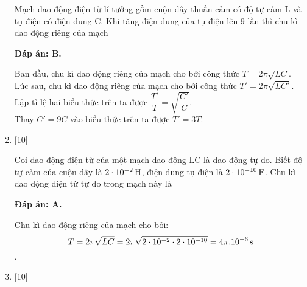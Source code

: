 \begin{enumerate}[label=\bfseries Câu \arabic*:]
	\cauhoi
	{Mạch dao động điện từ lí tưởng gồm cuộn dây thuần cảm có độ tự cảm L và tụ điện có điện dung C. Khi tăng điện dung của tụ điện lên 9 lần thì chu kì dao động riêng của mạch
	}
	
	\loigiai
	{		\textbf{Đáp án: B.}
		
		Ban đầu, chu kì dao động riêng của mạch cho bởi công thức $T = 2\pi \sqrt{LC}$. \\
		Lúc sau, chu kì dao động riêng của mạch cho bởi công thức $T' = 2\pi \sqrt{LC'}$. \\
		Lập tỉ lệ hai biểu thức trên ta được $\dfrac{T'}{T} = \sqrt{\dfrac{C'}{C}}$. \\
		Thay $C' = 9C$ vào biểu thức trên ta được $T' = 3T$.
		
	}

	\item {} [10]
	
	\cauhoi
	{Coi dao động điện từ của một mạch dao động LC là dao động tự do. Biết độ tự cảm của cuộn dây là $\xsi{2\cdot10^{-2}}{H}$, điện dung tụ điện là $\xsi{2\cdot10^{-10}}{F}$. Chu kì dao động điện từ tự do trong mạch này là
	}
	
	\loigiai
	{		\textbf{Đáp án: A.}
		
		Chu kì dao động riêng của mạch cho bởi:
		$$T = 2\pi \sqrt{LC} = 2\pi \sqrt{2\cdot10^{-2} \cdot 2\cdot10^{-10}} = \xsi{4\pi . 10^{-6}}{s}$$.
		
	}

	\item {} [10]
	

\end{enumerate}
